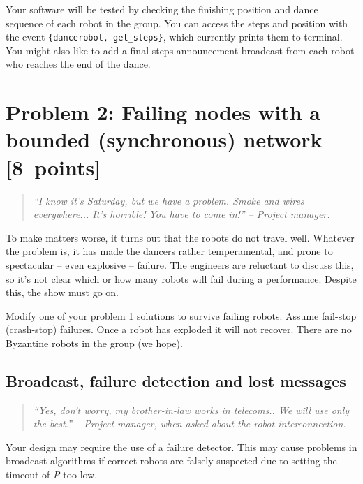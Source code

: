 \documentclass[a4paper]{article}
\begin{document}
Your software will be tested by checking the finishing position and dance
sequence of each robot in the group. You can access the steps and position
with the event \verb!{dancerobot, get_steps}!, which currently prints them to
terminal. You might also like to add a final-steps announcement broadcast
from each robot who reaches the end of the dance.












\section*{Problem 2: Failing nodes with a bounded (synchronous) network [8~points]} %
\label{sec:problem_2_failing_nodes}

\begin{quote}
  \emph{``I know it's Saturday, but we have a problem. Smoke and wires everywhere... It's horrible! You have to come in!'' -- Project manager.}
\end{quote}


To make matters worse, it turns out that the robots do not travel well.
Whatever the problem is, it has made the dancers rather temperamental, and
prone to spectacular -- even explosive -- failure. The engineers are reluctant
to discuss this, so it's not clear which or how many robots will fail during
a performance. Despite this, the show must go on.

Modify one of your problem 1 solutions to survive failing robots. Assume
fail-stop (crash-stop) failures. Once a robot has exploded it will not
recover. There are no Byzantine robots in the group (we hope).


\subsection*{Broadcast, failure detection and lost messages} %
\label{subsec:lost_messages}

\begin{quote}
  \emph{``Yes, don't worry, my brother-in-law works in telecoms.. We will use
  only the best.'' -- Project manager, when asked about the robot
  interconnection.}
\end{quote}

Your design may require the use of a failure detector. This may cause problems
in broadcast algorithms if correct robots are falsely suspected due to setting
the timeout of \emph{P} too low.
\end{document}
